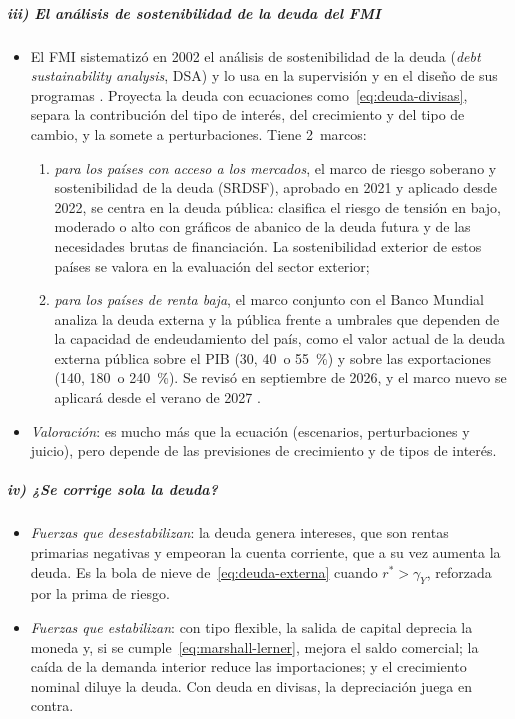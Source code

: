 \documentclass[11pt]{article}
\begin{document}
\subparagraph{iii) El análisis de sostenibilidad de la deuda del FMI}

\begin{itemize}
\item El FMI sistematizó en 2002 el análisis de sostenibilidad de la deuda (\emph{debt sustainability analysis}, DSA) y lo usa en la supervisión y en el diseño de sus programas\nocite{FMI2002Sustainability} . Proyecta la deuda con ecuaciones como~\eqref{eq:deuda-divisas}, separa la contribución del tipo de interés, del crecimiento y del tipo de cambio, y la somete a perturbaciones. Tiene 2~marcos:
  \begin{enumerate}
  \item \emph{para los países con acceso a los mercados}, el marco de riesgo soberano y sostenibilidad de la deuda (SRDSF), aprobado en 2021 y aplicado desde 2022, se centra en la deuda pública: clasifica el riesgo de tensión en bajo, moderado o alto con gráficos de abanico de la deuda futura y de las necesidades brutas de financiación\nocite{FMI2021DSA,FMI2022SRDSF}. La sostenibilidad exterior de estos países se valora en la evaluación del sector exterior;
  \item \emph{para los países de renta baja}, el marco conjunto con el Banco Mundial analiza la deuda externa y la pública frente a umbrales que dependen de la capacidad de endeudamiento del país, como el valor actual de la deuda externa pública sobre el PIB (30, 40~o 55~\%) y sobre las exportaciones (140, 180~o 240~\%)\nocite{FMI2018LICDSF}. Se revisó en septiembre de 2026, y el marco nuevo se aplicará desde el verano de 2027\nocite{FMI2026LICDSF} .
  \end{enumerate}
\item \emph{Valoración}: es mucho más que la ecuación (escenarios, perturbaciones y juicio), pero depende de las previsiones de crecimiento y de tipos de interés.
\end{itemize}

\subparagraph{iv) ¿Se corrige sola la deuda?}

\begin{itemize}
\item \emph{Fuerzas que desestabilizan}: la deuda genera intereses, que son rentas primarias negativas y empeoran la cuenta corriente, que a su vez aumenta la deuda. Es la bola de nieve de~\eqref{eq:deuda-externa} cuando $r^*>\gamma_Y$, reforzada por la prima de riesgo.
\item \emph{Fuerzas que estabilizan}: con tipo flexible, la salida de capital deprecia la moneda y, si se cumple~\eqref{eq:marshall-lerner}, mejora el saldo comercial; la caída de la demanda interior reduce las importaciones; y el crecimiento nominal diluye la deuda. Con deuda en divisas, la depreciación juega en contra.
\end{itemize}
\end{document}
